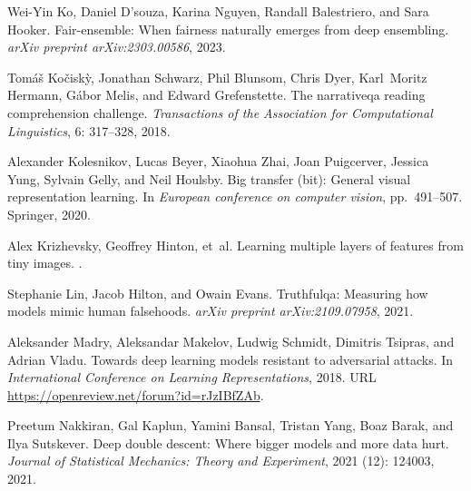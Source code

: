 \documentclass{article} %
\begin{document}
\begin{thebibliography}{67}
Wei-Yin Ko, Daniel D'souza, Karina Nguyen, Randall Balestriero, and Sara
  Hooker.
\newblock Fair-ensemble: When fairness naturally emerges from deep ensembling.
\newblock \emph{arXiv preprint arXiv:2303.00586}, 2023.

Tom{\'a}{\v{s}} Ko{\v{c}}isk{\`y}, Jonathan Schwarz, Phil Blunsom, Chris Dyer,
  Karl~Moritz Hermann, G{\'a}bor Melis, and Edward Grefenstette.
\newblock The narrativeqa reading comprehension challenge.
\newblock \emph{Transactions of the Association for Computational Linguistics},
  6: 317--328, 2018.

Alexander Kolesnikov, Lucas Beyer, Xiaohua Zhai, Joan Puigcerver, Jessica Yung,
  Sylvain Gelly, and Neil Houlsby.
\newblock Big transfer (bit): General visual representation learning.
\newblock In \emph{European conference on computer vision}, pp.\  491--507.
  Springer, 2020.

Alex Krizhevsky, Geoffrey Hinton, et~al.
\newblock Learning multiple layers of features from tiny images.
.

Stephanie Lin, Jacob Hilton, and Owain Evans.
\newblock Truthfulqa: Measuring how models mimic human falsehoods.
\newblock \emph{arXiv preprint arXiv:2109.07958}, 2021.

Aleksander Madry, Aleksandar Makelov, Ludwig Schmidt, Dimitris Tsipras, and
  Adrian Vladu.
\newblock Towards deep learning models resistant to adversarial attacks.
\newblock In \emph{International Conference on Learning Representations}, 2018.
\newblock URL \url{https://openreview.net/forum?id=rJzIBfZAb}.

Preetum Nakkiran, Gal Kaplun, Yamini Bansal, Tristan Yang, Boaz Barak, and Ilya
  Sutskever.
\newblock Deep double descent: Where bigger models and more data hurt.
\newblock \emph{Journal of Statistical Mechanics: Theory and Experiment},
  2021 (12): 124003, 2021.


\end{thebibliography}
\end{document}
